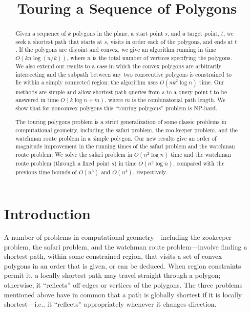 \documentclass[a4paper]{article}
\begin{document}
\title{Touring a Sequence of Polygons}
\maketitle

\begin{abstract}

	Given a sequence of \(k\) polygons in the plane, a start point \(s\), and a target point, \(t\), we seek a shortest path that starts at \(s\), visits in order each of the polygons, and ends at \(t\). If the polygons are disjoint and convex, we give an algorithm running in time \(O(kn \log(n/k))\), where \(n\) is the total number of vertices specifying the polygons. We also extend our results to a case in which the convex polygons are arbitrarily intersecting and the subpath between any two consecutive polygons is constrained to lie within a simply connected region; the algorithm uses \(O(n k^2 \log n)\) time. Our methods are simple and allow shortest path queries from \(s\) to a query point \(t\) to be answered in time \(O(k \log n + m)\), where \(m\) is the combinatorial path length. We show that for nonconvex polygons this “touring polygons” problem is NP-hard. 
	
	The touring polygons problem is a strict generalization of some classic problems in computational geometry, including the safari problem, the zoo-keeper problem, and the watchman route problem in a simple polygon. Our new results give an order of magnitude improvement in the running times of the safari problem and the watchman route problem: We solve the safari problem in \(O(n ^ 2 \log n)\) time and the watchman route problem (through a fixed point \(s\)) in time \(O(n ^ 3 \log n)\), compared with the previous time bounds of \(O(n ^ 3)\) and \(O(n ^ 4)\), respectively.

\end{abstract}

\vfill

\section{Introduction}

A number of problems in computational geometry—including the zookeeper problem, the safari problem, and the watchman route problem—involve finding a shortest path, within some constrained region, that visits a set of convex polygons in an order that is given, or can be deduced. When region constraints permit it, a locally shortest path may travel straight through a polygon; otherwise, it “reflects” oﬀ edges or vertices of the polygons. The three problems mentioned above have in common that a path is globally shortest if it is locally shortest—i.e., it “reflects” appropriately whenever it changes direction.
\end{document}
